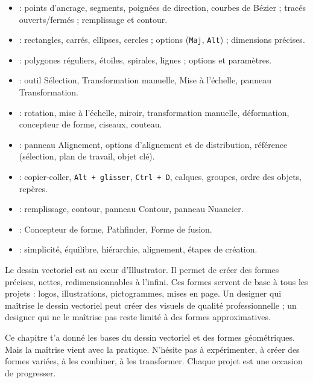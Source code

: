 \begin{itemize}
    \item {} : points d'ancrage, segments, poignées de direction, courbes de Bézier ; tracés ouverts/fermés ; remplissage et contour.
    \item {} : rectangles, carrés, ellipses, cercles ; options (\texttt{Maj}, \texttt{Alt}) ; dimensions précises.
    \item {} : polygones réguliers, étoiles, spirales, lignes ; options et paramètres.
    \item {} : outil Sélection, Transformation manuelle, Mise à l'échelle, panneau Transformation.
    \item {} : rotation, mise à l'échelle, miroir, transformation manuelle, déformation, concepteur de forme, ciseaux, couteau.
    \item {} : panneau Alignement, options d'alignement et de distribution, référence (sélection, plan de travail, objet clé).
    \item {} : copier-coller, \texttt{Alt + glisser}, \texttt{Ctrl + D}, calques, groupes, ordre des objets, repères.
    \item {} : remplissage, contour, panneau Contour, panneau Nuancier.
    \item {} : Concepteur de forme, Pathfinder, Forme de fusion.
    \item {} : simplicité, équilibre, hiérarchie, alignement, étapes de création.
\end{itemize}

Le dessin vectoriel est au cœur d'Illustrator. Il permet de créer des formes précises, nettes, redimensionnables à l'infini. Ces formes servent de base à tous les projets : logos, illustrations, pictogrammes, mises en page. Un designer qui maîtrise le dessin vectoriel peut créer des visuels de qualité professionnelle ; un designer qui ne le maîtrise pas reste limité à des formes approximatives.

Ce chapitre t'a donné les bases du dessin vectoriel et des formes géométriques. Mais la maîtrise vient avec la pratique. N'hésite pas à expérimenter, à créer des formes variées, à les combiner, à les transformer. Chaque projet est une occasion de progresser.

